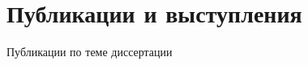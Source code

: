 \documentclass[22pt,aspectratio=169]{beamer}
\begin{document}
\section{Публикации и выступления}
\begin{frame}{Публикации по теме диссертации}
\footnotesize


\nocite{kostyukov2019auto}
\nocite{10.1145/3453483.3454055}
\nocite{LPAR2023:Collaborative_Inference_of_Combined}
\nocite{miso2022gen}
\end{frame}
\end{document}
